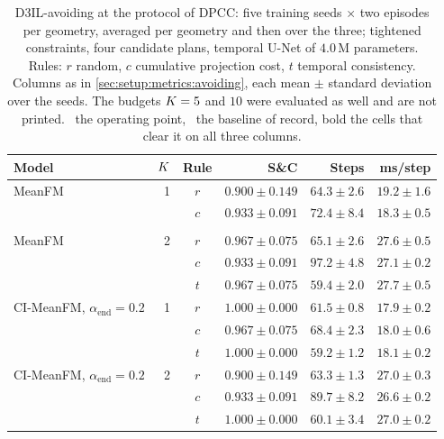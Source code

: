 \begin{table}[htpb]
  \caption[The generative models at the protocol of DPCC]{D3IL-avoiding at the protocol of \ac{DPCC}:
  five training seeds $\times$ two episodes per geometry, averaged per geometry and then over the three;
  tightened constraints, four candidate plans, temporal U-Net of $4.0$\,M parameters. Rules: $r$ random,
  $c$ cumulative projection cost, $t$ temporal consistency. Columns as in
  \autoref{sec:setup:metrics:avoiding}, each mean $\pm$ standard deviation over the seeds. The budgets
  $\nfe=5$ and $10$ were evaluated as well and are not printed. \selectedmark\ the operating
  point, \baselinemark\ the baseline of record, bold the cells that clear it on all three columns.}
  \label{tab:avoiding-dpcc-protocol}
  \centering
  \footnotesize
  \begin{tabularx}{\linewidth}{@{}L r c rrr@{}}
    \toprule
    Model & $K$ & Rule & S\&C & Steps & ms/step \\
    \midrule
    MeanFM     & 1 & $r$ & $0.900 \pm 0.149$ & $64.3 \pm 2.6$ & $19.2 \pm 1.6$ \\
                     &    & $c$ & $0.933 \pm 0.091$ & $72.4 \pm 8.4$ & $18.3 \pm 0.5$ \\
                     &    &  &  &  &   \\
    MeanFM     & 2 & $r$ & $0.967 \pm 0.075$ & $65.1 \pm 2.6$ & $27.6 \pm 0.5$ \\
                     &    & $c$ & $0.933 \pm 0.091$ & $97.2 \pm 4.8$ & $27.1 \pm 0.2$ \\
                     &    & $t$ & $0.967 \pm 0.075$ & $59.4 \pm 2.0$ & $27.7 \pm 0.5$ \\
    \midrule
    CI-MeanFM, $\alpha_{\mathrm{end}}=0.2$ & 1 & $r$ & $1.000 \pm 0.000$ & $61.5 \pm 0.8$ & $17.9 \pm 0.2$ \\
                     &    & $c$ & $0.967 \pm 0.075$ & $68.4 \pm 2.3$ & $18.0 \pm 0.6$ \\
                     &    & \textbf{$t$} & \textbf{$1.000 \pm 0.000$} & \textbf{$59.2 \pm 1.2$} & \textbf{$18.1 \pm 0.2$} \\
    CI-MeanFM, $\alpha_{\mathrm{end}}=0.2$ & 2 & $r$ & $0.900 \pm 0.149$ & $63.3 \pm 1.3$ & $27.0 \pm 0.3$ \\
                     &    & $c$ & $0.933 \pm 0.091$ & $89.7 \pm 8.2$ & $26.6 \pm 0.2$ \\
                     &    & $t$ & $1.000 \pm 0.000$ & $60.1 \pm 3.4$ & $27.0 \pm 0.2$ \\

\end{tabularx}
\end{table}
